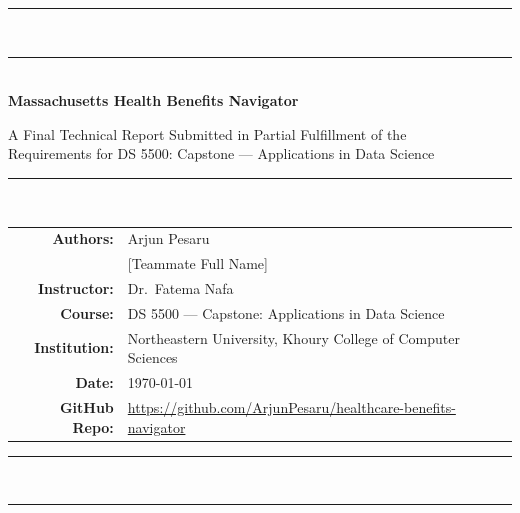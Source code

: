 \documentclass[12pt, letterpaper]{article}
\begin{document}
\begin{titlepage}
  \centering
  \vspace*{1cm}

  {\color{NUred}\rule{\linewidth}{3pt}}\\[0.4cm]
  {\color{NUdark}\rule{\linewidth}{1pt}}\\[1.5cm]

  {\Huge\bfseries\color{NUdark}
    Massachusetts Health Benefits Navigator\\[0.5cm]
  }

  {\large\color{NUdark}
    A Final Technical Report Submitted in Partial Fulfillment of the\\
    Requirements for DS 5500: Capstone --- Applications in Data Science
  }\\[1.5cm]

  {\color{NUdark}\rule{\linewidth}{1pt}}\\[0.8cm]

  \begin{tabular}{rl}
    \textbf{Authors:}       & Arjun Pesaru \\
                            & [Teammate Full Name] \\[0.4cm]
    \textbf{Instructor:}    & Dr.\ Fatema Nafa \\[0.2cm]
    \textbf{Course:}        & DS 5500 --- Capstone: Applications in Data Science \\[0.2cm]
    \textbf{Institution:}   & Northeastern University, Khoury College of Computer Sciences \\[0.2cm]
    \textbf{Date:}          & \today \\[0.4cm]
    \textbf{GitHub Repo:}   & \url{https://github.com/ArjunPesaru/healthcare-benefits-navigator} \\
  \end{tabular}

  \vspace{1.5cm}
  {\color{NUdark}\rule{\linewidth}{1pt}}\\[0.3cm]
  {\color{NUred}\rule{\linewidth}{3pt}}

  \vfill
\end{titlepage}
\end{document}

